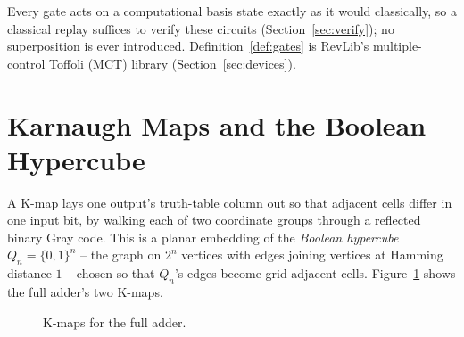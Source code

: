 \documentclass[conference]{IEEEtran}
\theoremstyle{plain}
\begin{document}
Every gate acts on a computational basis state exactly as it would
classically, so a classical replay suffices to verify these circuits
(Section~\ref{sec:verify}); no superposition is ever introduced.
Definition~\ref{def:gates} is RevLib's multiple-control Toffoli (MCT)
library (Section~\ref{sec:devices}).

\section{Karnaugh Maps and the Boolean Hypercube}
\label{sec:kmaps}

A K-map lays one output's truth-table column out so that adjacent cells
differ in one input bit, by walking each of two coordinate groups through
a reflected binary Gray code. This is a planar embedding of the
\emph{Boolean hypercube} $Q_n=\{0,1\}^n$ -- the graph on $2^n$ vertices
with edges joining vertices at Hamming distance $1$ -- chosen so that
$Q_n$'s edges become grid-adjacent cells. Figure~\ref{fig:kmaps} shows the
full adder's two K-maps.

\begin{figure}[t]
\centering
\begin{minipage}{0.48\linewidth}
\centering
{}
\par\vspace{2pt}{\scriptsize Sum: no two 1-cells adjacent (parity).}
\end{minipage}
\hfill
\begin{minipage}{0.48\linewidth}
\centering
{}
\par{}
\end{minipage}
\caption{K-maps for the full adder.}
\label{fig:kmaps}
\end{figure}
\end{document}
